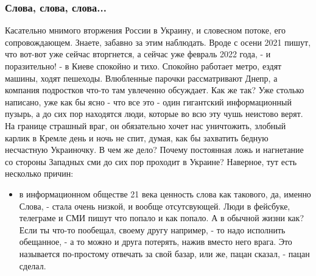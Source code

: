  
 
 
 
 
\clearpage
\subsubsection{Слова, слова, слова...}

Касательно мнимого вторжения России в Украину, и словесном потоке, его
сопровождающем.  Знаете, забавно за этим наблюдать. Вроде с осени 2021 пишут,
что вот-вот уже сейчас вторгнется, а сейчас уже февраль 2022 года, - и
поразительно! - в Киеве спокойно и тихо. Спокойно работает метро, ездят машины,
ходят пешеходы. Влюбленные парочки рассматривают Днепр, а компания подростков
что-то там увлеченно обсуждает.  Как же так? Уже столько написано, уже как бы
ясно - что все это - один гигантский информационный пузырь, а до сих пор
находятся люди, которые во всю эту чушь неистово верят. На границе страшный
враг, он обязательно хочет нас уничтожить, злобный карлик в Кремле день и ночь
не спит, думая, как бы захватить бедную несчастную Украиночку. В чем же дело?
Почему постоянная ложь и нагнетание со стороны Западных сми до сих пор проходит
в Украине? Наверное, тут есть несколько причин:

\begin{itemize} %
\item в информационном обществе 21 века ценность слова как такового, да, именно
Слова, - стала очень низкой, и вообще отсутсвующей. Люди в фейсбуке,
телеграме и СМИ пишут что попало и как попало.  А в обычной
жизни как? Если ты что-то пообещал, своему другу например, - то
надо исполнить обещанное, - а то можно и друга потерять, нажив
вместо него врага. Это называется по-простому отвечать за свой
базар, или же, пацан сказал, - пацан сделал.
\end{itemize} %
